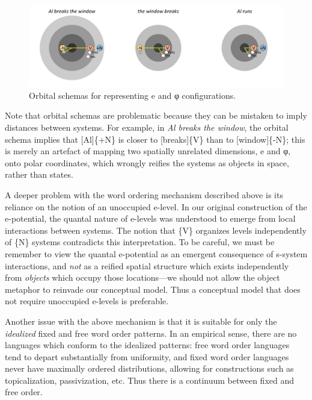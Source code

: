   
\begin{figure}
\includegraphics[width=\textwidth]{figures/Tilsen-img76.png}
\caption{Orbital schemas for representing e and φ configurations.}
\label{fig:4:26}
\end{figure}
 

  Note that orbital schemas are problematic because they can be mistaken to imply distances between systems. For example, in \textit{Al breaks the window}, the orbital schema implies that [Al]\{+N\} is closer to [breaks]\{V\} than to [window]\{-N\}; this is merely an artefact of mapping two spatially unrelated dimensions, e and φ, onto polar coordinates, which wrongly reifies the systems as objects in space, rather than states.

  A deeper problem with the word ordering mechanism described above is its reliance on the notion of an unoccupied e-level. In our original construction of the e-potential, the quantal nature of e-levels was understood to emerge from local interactions between systems. The notion that \{V\} organizes levels independently of \{N\} systems contradicts this interpretation. To be careful, we must be remember to view the quantal e-potential as an emergent consequence of s-system interactions, and \textit{not} as a reified spatial structure which exists independently from \textit{objects} which occupy those locations—we should not allow the object metaphor to reinvade our conceptual model. Thus a conceptual model that does not require unoccupied e-levels is preferable.

  Another issue with the above mechanism is that it is suitable for only the \textit{idealized} fixed and free word order patterns. In an empirical sense, there are no languages which conform to the idealized patterns: free word order languages tend to depart substantially from uniformity, and fixed word order languages never have maximally ordered distributions, allowing for constructions such as topicalization, passivization, etc. Thus there is a continuum between fixed and free order. 

